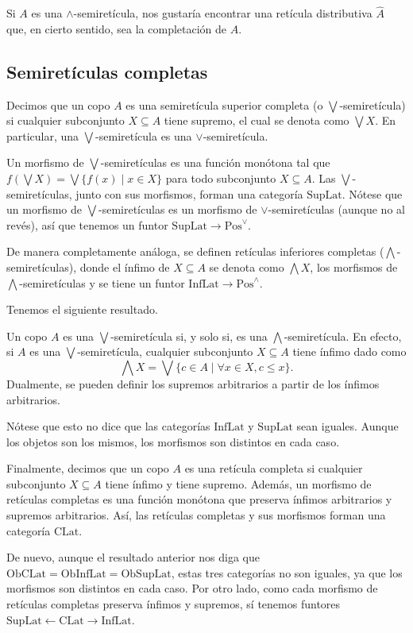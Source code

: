 \documentclass[12pt,letterpaper,titlepage]{article}
\theoremstyle{definition}
\renewcommand\sup{\vee}
\newcommand\Sup{\bigvee}
\renewcommand\inf{\wedge}
\newcommand\Inf{\bigwedge}
\newcommand\<{\langle}
\renewcommand\>{\rangle}
\newcommand{\Pos}{\mathrm{Pos}}
\newcommand{\SupLat}{\mathrm{SupLat}}
\newcommand{\InfLat}{\mathrm{InfLat}}
\newcommand{\CLat}{\mathrm{CLat}}
\newcommand{\Ob}{\mathrm{Ob}}
\begin{document}
Si $A$ es una $\inf$-semiretícula, nos gustaría encontrar una
retícula distributiva $\hat A$ que, en cierto sentido, sea la
completación de $A$.

\subsection{Semiretículas completas}
Decimos que un copo $A$ es una semiretícula superior
completa (o $\Sup$-semiretícula)
si cualquier subconjunto $X\subseteq A$ tiene supremo,
el cual se denota como $\Sup X$.
En particular, una $\Sup$-semiretícula es una $\sup$-semiretícula.

Un morfismo de $\Sup$-semiretículas
es una función monótona tal que $f(\Sup X)=\Sup\{f(x)\mid x\in X\}$
para todo subconjunto $X\subseteq A$.
Las $\Sup$-semiretículas, junto con sus morfismos,
forman una categoría $\SupLat$.
Nótese que un morfismo de $\Sup$-semiretículas es un morfismo de
$\sup$-semiretículas (aunque no al revés),
así que tenemos un funtor $\SupLat\to\Pos^\sup$.

De manera completamente análoga, se definen 
retículas inferiores completas ($\Inf$-semiretículas),
donde el ínfimo de $X\subseteq A$ se denota como $\Inf X$, los
morfismos de $\Inf$-semiretículas y se tiene un funtor
$\InfLat\to\Pos^\inf$.

Tenemos el siguiente resultado.

Un copo $A$ es una $\Sup$-semiretícula si, y solo si, es una
$\Inf$-semiretícula.
En efecto, si $A$ es una $\Sup$-semiretícula, cualquier subconjunto
$X\subseteq A$ tiene ínfimo dado como
\[
  \Inf X = \Sup\{c\in A \mid \forall x\in X, c\leq x\}
.\]
Dualmente, se pueden definir los supremos arbitrarios a partir
de los ínfimos arbitrarios.

Nótese que esto no dice que las categorías $\InfLat$
y $\SupLat$ sean iguales.
Aunque los objetos son los mismos, los morfismos son distintos
en cada caso.

Finalmente, decimos que un copo $A$ es una retícula completa
si cualquier subconjunto $X\subseteq A$ tiene ínfimo y tiene supremo.
Además, un morfismo de retículas completas es una función monótona
que preserva ínfimos arbitrarios y supremos arbitrarios.
Así, las retículas completas y sus morfismos forman una categoría
$\CLat$.

De nuevo, aunque el resultado anterior nos diga que
$\Ob\CLat=\Ob\InfLat=\Ob\SupLat$,
estas tres categorías no son iguales,
ya que los morfismos son distintos en cada caso.
Por otro lado, como cada morfismo de retículas completas
preserva ínfimos y supremos, sí tenemos funtores
$\SupLat \leftarrow \CLat \to \InfLat$.
\end{document}

